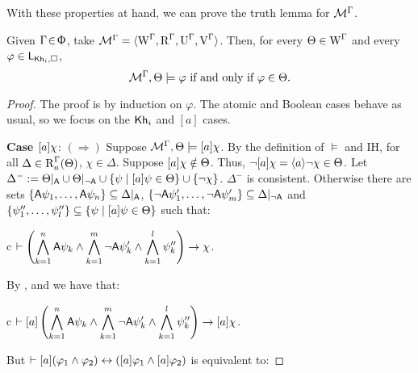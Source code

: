 \medskip

With these properties at hand, we can prove the truth lemma for $\mathcal{M}^\Gamma$.

\medskip

\begin{lemma}\label{tlm:cm-ults-lkhi}
Given $\Gamma \!\in\! \Upphi$, take $\mathcal{M}^\Gamma = \langle \operatorname{W}^\Gamma, \operatorname{R}^\Gamma, \operatorname{U}^\Gamma, \operatorname{V}^\Gamma \rangle$. Then, for every $\Theta \in \operatorname{W}^\Gamma$ and every $\varphi \in \mathsf{L}_{{\sf Kh}_i,\square}$,  %
\[
\mathcal{M}^\Gamma, \Theta \models \varphi \mbox{ if and only if } \varphi \in \Theta.
\]
\end{lemma}
\begin{proof}
The proof is by induction on $\varphi$.
The atomic and Boolean cases behave as usual, so we focus on the ${\sf Kh}_i$ and $[a]$ cases.
\medskip

\noindent
\textbf{Case $[a]\chi$}: $(\Rightarrow)$ Suppose $\mathcal{M}^\Gamma,\Theta \models [a]\chi$. By the definition of $\models$ and IH, for all $\Delta \in \operatorname{R}^\Gamma_a(\Theta)$, $\chi \in \Delta$.
Suppose $[a]\chi \notin \Theta$. Thus, $\neg[a]\chi = \langle a \rangle\neg\chi \in \Theta$.
Let $\Delta^- := \Theta\vert_{{\sf A}} \cup \Theta\vert_{\lnot{\sf A}} \cup \{ \psi \mid [a]\psi \in \Theta \} \cup \{ \neg\chi \}$. $\Delta^-$ is consistent.
Otherwise there are sets $\{ {\sf A}\psi_1, \ldots, {\sf A}\psi_n \} \subseteq \Delta\vert_{{\sf A}}$, $\{ \lnot {\sf A}\psi'_1, \ldots, \lnot {\sf A}\psi'_m \} \subseteq \Delta\vert_{\lnot{\sf A}}$ and $\{ \psi''_1, \ldots, \psi''_l \} \subseteq \{ \psi \mid [a]\psi \in \Theta \}$ such that:

\begin{ctabular}{c}
$\vdash
\displaystyle
\left( \bigwedge_{k=1}^{n} {\sf A}\psi_k \land \bigwedge_{k=1}^{m} \lnot {\sf A}\psi'_k \land \bigwedge_{k=1}^{l} \psi''_k \right)
\rightarrow \chi$.
\end{ctabular}

By ,  and  we have that:

\begin{ctabular}{c}
$\vdash
\displaystyle
[a] \left( \bigwedge_{k=1}^{n} {\sf A}\psi_k \land \bigwedge_{k=1}^{m} \lnot {\sf A}\psi'_k \land \bigwedge_{k=1}^{l} \psi''_k \right)
\rightarrow [a] \chi$.
\end{ctabular}

But $\vdash [a](\varphi_1 \wedge \varphi_2) \leftrightarrow ([a] \varphi_1 \wedge [a] \varphi_2)$ is equivalent to:


\end{proof}
